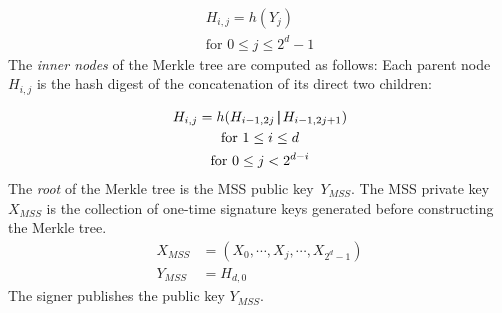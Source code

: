 \begin{gather}
\label{eq:leaf_merkle_tree:hash_digest_publ_key_Y}
H_{i,j} = h(Y_j) \\ 
\text{for } 0 \leq j \leq 2^d - 1 \nonumber
\end{gather}
The \textit{inner nodes} of the Merkle tree are computed as follows: Each parent node $H_{i,j}$ is the hash digest of the concatenation of its direct two children: %

\begin{gather}
\label{eq:inner_nodes_merkle_tree_keygen}
H_{i,j} = h(H_{i-1,2j} \operatorname{|\!\!|} H_{i-1,2j+1}) \\
\text{for } 1 \leq i \leq d \nonumber \\ 
\text{for } 0 \leq j < 2^{d - i} \nonumber
\end{gather} 
The \textit{root} of the Merkle tree is the MSS public key~$Y_{MSS}$. The MSS private key~$X_{MSS}$ is the collection of one-time signature keys generated before constructing the Merkle tree.
\begin{align}
\label{eq:mss_priv_key}
X_{MSS} &= (X_0, \cdots, X_j, \cdots, X_{2^d - 1} ) \\
Y_{MSS} &= H_{d,0} \nonumber
\end{align}
The signer publishes the public key $Y_{MSS}$.

